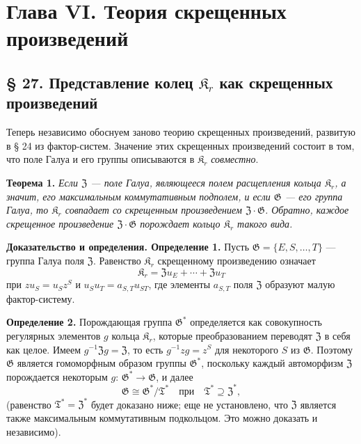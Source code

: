 \documentclass[11pt]{article}
\begin{document}
\section*{Глава VI. Теория скрещенных произведений}\label{kapitel-vi.-theorie-der-verschraenkten-produkte}

\subsection*{§ 27. Представление колец \(\mathfrak K_r\) как скрещенных произведений}

Теперь независимо обоснуем заново теорию скрещенных произведений, развитую в § 24 из фактор-систем. Значение этих скрещенных произведений состоит в том, что поле Галуа и его группы описываются в \(\mathfrak K_r\) \emph{совместно}.

\noindent\textbf{Теорема 1.} \emph{Если \(\mathfrak Z\) --- поле Галуа, являющееся полем расщепления кольца \(\mathfrak K_r\), а значит, его максимальным коммутативным подполем, и если \(\mathfrak G\) --- его группа Галуа, то \(\mathfrak K_r\) совпадает со скрещенным произведением \(\mathfrak Z\cdot\mathfrak G\). Обратно, каждое скрещенное произведение \(\mathfrak Z\cdot\mathfrak G\) порождает кольцо \(\mathfrak K_r\) такого вида.}

\noindent\textbf{Доказательство и определения. Определение 1.} Пусть \(\mathfrak G=\{E,S,\ldots,T\}\) --- группа Галуа поля \(\mathfrak Z\). Равенство \(\mathfrak K_r\) скрещенному произведению означает
\[
\mathfrak K_r=\mathfrak Zu_E+\cdots+\mathfrak Zu_T
\]
при \(zu_S=u_Sz^S\) и \(u_Su_T=a_{S,T}u_{ST}\), где элементы \(a_{S,T}\) поля \(\mathfrak Z\) образуют малую фактор-систему.

\noindent\textbf{Определение 2.} Порождающая группа \(\mathfrak G^*\) определяется как совокупность регулярных элементов \(g\) кольца \(\mathfrak K_r\), которые преобразованием переводят \(\mathfrak Z\) в себя как целое. Имеем \(g^{-1}\mathfrak Zg=\mathfrak Z\), то есть \(g^{-1}zg=z^S\) для некоторого \(S\) из \(\mathfrak G\). Поэтому \(\mathfrak G\) является гомоморфным образом группы \(\mathfrak G^*\), поскольку каждый автоморфизм \(\mathfrak Z\) порождается некоторым \(g\): \(\mathfrak G^*\to\mathfrak G\), и далее
\[
\mathfrak G\cong\mathfrak G^*/\mathfrak T^*
\quad\text{при}\quad
\mathfrak T^*\supseteq\mathfrak Z^*,
\]
(равенство \(\mathfrak T^*=\mathfrak Z^*\) будет доказано ниже; еще не установлено, что \(\mathfrak Z\) является также максимальным коммутативным подкольцом. Это можно доказать и независимо).
\end{document}
